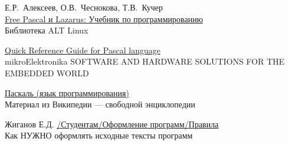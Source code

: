 \documentclass[unicode, 12pt, a4paper,oneside,fleqn]{article}
\begin{document}
\begin{thebibliography}{9}
  Е.Р.~Алексеев, О.В.~Чеснокова, Т.В.~Кучер\\
  \href{http://www.altlinux.org/Books:FreePascal}{Free Pascal и Lazarus: Учебник по программированию} \\
  Библиотека ALT Linux
  
  \href{http://www.elettroshop.com/files/prodotti/download/mikroelektronica/pascal_syntax.pdf}{Quick Reference Guide for Pascal language} \\
  mikroElektronika SOFTWARE AND HARDWARE SOLUTIONS FOR THE EMBEDDED WORLD

  \href{http://ru.wikipedia.org/wiki/Pascal}{Паскаль (язык программирования)} \\
  Материал из Википедии — свободной энциклопедии 

  Жиганов Е.Д.  \href{http://zed.karelia.ru/go.to/for.students/coding.rules/rules}{/Студентам/Оформление программ/Правила} \\
  Как НУЖНО оформлять исходные тексты программ
  
\end{thebibliography}
\end{document}
